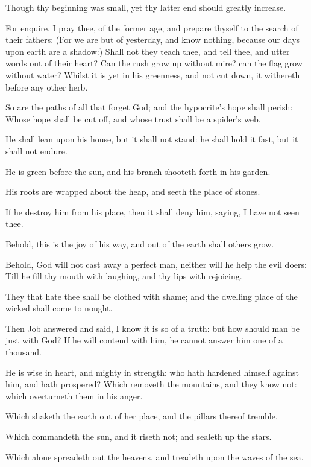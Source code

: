 \Verse Though thy beginning was small, yet thy latter end should greatly increase.

\Verse For enquire, I pray thee, of the former age, and prepare thyself to the search of their fathers: \Verse (For we are but of yesterday, and know nothing, because our days upon earth are a shadow:) \Verse Shall not they teach thee, and tell thee, and utter words out of their heart?  \Verse Can the rush grow up without mire? can the flag grow without water?  \Verse Whilst it is yet in his greenness, and not cut down, it withereth before any other herb.

\Verse So are the paths of all that forget God; and the hypocrite's hope shall perish: \Verse Whose hope shall be cut off, and whose trust shall be a spider's web.

\Verse He shall lean upon his house, but it shall not stand: he shall hold it fast, but it shall not endure.

\Verse He is green before the sun, and his branch shooteth forth in his garden.

\Verse His roots are wrapped about the heap, and seeth the place of stones.

\Verse If he destroy him from his place, then it shall deny him, saying, I have not seen thee.

\Verse Behold, this is the joy of his way, and out of the earth shall others grow.

\Verse Behold, God will not cast away a perfect man, neither will he help the evil doers: \Verse Till he fill thy mouth with laughing, and thy lips with rejoicing.

\Verse They that hate thee shall be clothed with shame; and the dwelling place of the wicked shall come to nought.


\Chapter
\Verse Then Job answered and said, \Verse I know it is so of a truth: but how should man be just with God?  \Verse If he will contend with him, he cannot answer him one of a thousand.

\Verse He is wise in heart, and mighty in strength: who hath hardened himself against him, and hath prospered?  \Verse Which removeth the mountains, and they know not: which overturneth them in his anger.

\Verse Which shaketh the earth out of her place, and the pillars thereof tremble.

\Verse Which commandeth the sun, and it riseth not; and sealeth up the stars.

\Verse Which alone spreadeth out the heavens, and treadeth upon the waves of the sea.

